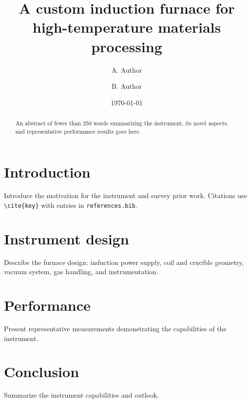 \documentclass[%
 aip,
 rsi,%
 amsmath,amssymb,
 reprint,%
]{revtex4-1}
\begin{document}

\title[Custom induction furnace]{A custom induction furnace for
high-temperature materials processing}

\author{A. Author}
\author{B. Author}%
%

\date{\today}

\begin{abstract}
An abstract of fewer than 250 words summarizing the instrument, its
novel aspects, and representative performance results goes here.
\end{abstract}

\maketitle

\section{\label{sec:intro}Introduction}

Introduce the motivation for the instrument and survey prior
work.\cite{Note1} Citations use \verb+\cite{key}+ with entries in
\texttt{references.bib}.

\section{\label{sec:design}Instrument design}

Describe the furnace design: induction power supply, coil and crucible
geometry, vacuum system, gas handling, and instrumentation.

\section{\label{sec:performance}Performance}

Present representative measurements demonstrating the capabilities of
the instrument.

\section{\label{sec:conclusion}Conclusion}

Summarize the instrument capabilities and outlook.
\end{document}
